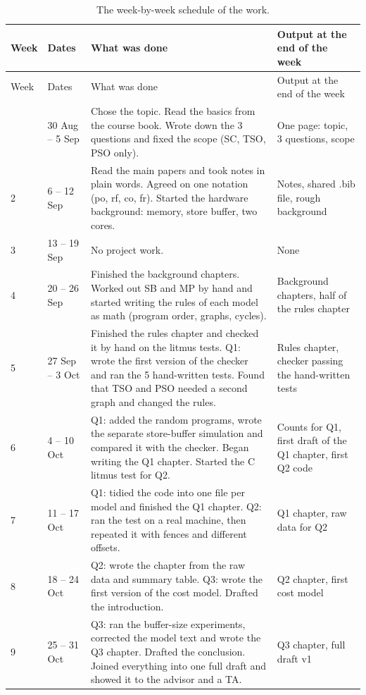 \begin{longtable}{@{}>{\raggedright}p{0.9cm}>{\raggedright}p{2.5cm}>{\raggedright}p{7.2cm}>{\raggedright\arraybackslash}p{4.2cm}@{}}
\caption{The week-by-week schedule of the work.}\label{tab:schedule}\\
\toprule
Week & Dates & What was done & Output at the end of the week\\
\midrule
\endfirsthead
\toprule
Week & Dates & What was done & Output at the end of the week\\
\midrule
\endhead
\bottomrule
\endlastfoot
1 & 30 Aug -- 5 Sep & Chose the topic. Read the basics from the course book. Wrote down the 3 questions and fixed the scope (SC, TSO, PSO only). & One page: topic, 3 questions, scope \\
2 & 6 -- 12 Sep & Read the main papers and took notes in plain words. Agreed on one notation (po, rf, co, fr). Started the hardware background: memory, store buffer, two cores. & Notes, shared .bib file, rough background \\
3 & 13 -- 19 Sep & No project work. & None \\
4 & 20 -- 26 Sep & Finished the background chapters. Worked out SB and MP by hand and started writing the rules of each model as math (program order, graphs, cycles). & Background chapters, half of the rules chapter \\
5 & 27 Sep -- 3 Oct & Finished the rules chapter and checked it by hand on the litmus tests. Q1: wrote the first version of the checker and ran the 5 hand-written tests. Found that TSO and PSO needed a second graph and changed the rules. & Rules chapter, checker passing the hand-written tests \\
6 & 4 -- 10 Oct & Q1: added the random programs, wrote the separate store-buffer simulation and compared it with the checker. Began writing the Q1 chapter. Started the C litmus test for Q2. & Counts for Q1, first draft of the Q1 chapter, first Q2 code \\
7 & 11 -- 17 Oct & Q1: tidied the code into one file per model and finished the Q1 chapter. Q2: ran the test on a real machine, then repeated it with fences and different offsets. & Q1 chapter, raw data for Q2 \\
8 & 18 -- 24 Oct & Q2: wrote the chapter from the raw data and summary table. Q3: wrote the first version of the cost model. Drafted the introduction. & Q2 chapter, first cost model \\
9 & 25 -- 31 Oct & Q3: ran the buffer-size experiments, corrected the model text and wrote the Q3 chapter. Drafted the conclusion. Joined everything into one full draft and showed it to the advisor and a TA. & Q3 chapter, full draft v1 \\

\end{longtable}

